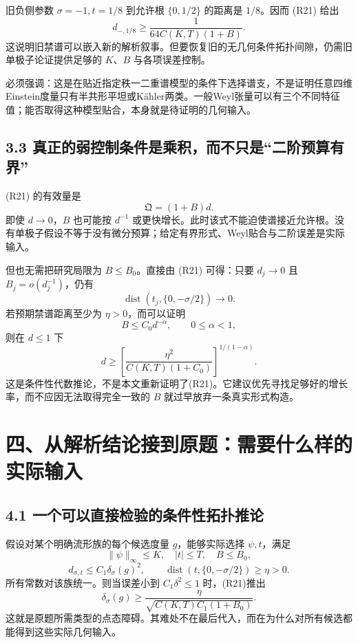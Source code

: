 \documentclass[
  11pt,
  a4paper,
  fontset=none]{ctexart}
\begin{document}
旧负侧参数 \(\sigma=-1,t=1/8\) 到允许根 \(\{0,1/2\}\) 的距离是
\(1/8\)。因而 (R21) 给出 \[
d_{-,1/8}\ge\frac{1}{64C(K,T)(1+B)}.
\]
这说明旧禁谱可以嵌入新的解析叙事。但要恢复旧的无几何条件拓扑间隙，仍需旧单极子论证提供足够的
\(K\)、\(B\) 与各项误差控制。

必须强调：这是在贴近指定秩一二重谱模型的条件下选择谱支，不是证明任意四维Einstein度量只有半共形平坦或Kähler两类。一般Weyl张量可以有三个不同特征值；能否取得这种模型贴合，本身就是待证明的几何输入。

\subsection{3.3
真正的弱控制条件是乘积，而不只是``二阶预算有界''}\label{ux771fux6b63ux7684ux5f31ux63a7ux5236ux6761ux4ef6ux662fux4e58ux79efux800cux4e0dux53eaux662fux4e8cux9636ux9884ux7b97ux6709ux754c}

(R21) 的有效量是 \[
\mathfrak Q=(1+B)d.
\] 即使 \(d\to0\)，\(B\) 也可能按 \(d^{-1}\)
或更快增长。此时该式不能迫使谱接近允许根。没有单极子假设不等于没有微分预算；给定有界形式、Weyl贴合与二阶误差是实际输入。

但也无需把研究局限为 \(B\le B_0\)。直接由 (R21) 可得：只要 \(d_j\to0\)
且 \(B_j=o(d_j^{-1})\)，仍有 \[
\operatorname{dist}(t_j,\{0,-\sigma/2\})\to0.
\] 若预期禁谱距离至少为 \(\eta>0\)，而可以证明 \[
B\le C_0d^{-\alpha},\qquad0\le\alpha<1,
\] 则在 \(d\le1\) 下 \[
\boxed{
 d\ge\left[\frac{\eta^2}{C(K,T)(1+C_0)}\right]^{1/(1-\alpha)}.
}
\]
这是条件性代数推论，不是本文重新证明了(R21)。它建议优先寻找足够好的增长率，而不应因无法取得完全一致的
\(B\) 就过早放弃一条真实形式构造。

\section{四、从解析结论接到原题：需要什么样的实际输入}\label{ux56dbux4eceux89e3ux6790ux7ed3ux8bbaux63a5ux5230ux539fux9898ux9700ux8981ux4ec0ux4e48ux6837ux7684ux5b9eux9645ux8f93ux5165}

\subsection{4.1
一个可以直接检验的条件性拓扑推论}\label{ux4e00ux4e2aux53efux4ee5ux76f4ux63a5ux68c0ux9a8cux7684ux6761ux4ef6ux6027ux62d3ux6251ux63a8ux8bba}

假设对某个明确流形族的每个候选度量 \(g\)，能够实际选择 \(\psi,t\)，满足
\[
\|\psi\|_\infty\le K,\quad |t|\le T,\quad B\le B_0,
\] \[
 d_{\sigma,t}\le C_1\delta_\sigma(g)^2,
 \qquad \operatorname{dist}(t,\{0,-\sigma/2\})\ge\eta>0.
\] 所有常数对该族统一。则当误差小到 \(C_1\delta^2\le1\) 时，(R21)推出 \[
\delta_\sigma(g)\ge
\frac{\eta}{\sqrt{C(K,T)C_1(1+B_0)}}.
\]
这就是原题所需类型的点态障碍。其难处不在最后代入，而在为什么对所有候选都能得到这些实际几何输入。
\end{document}
